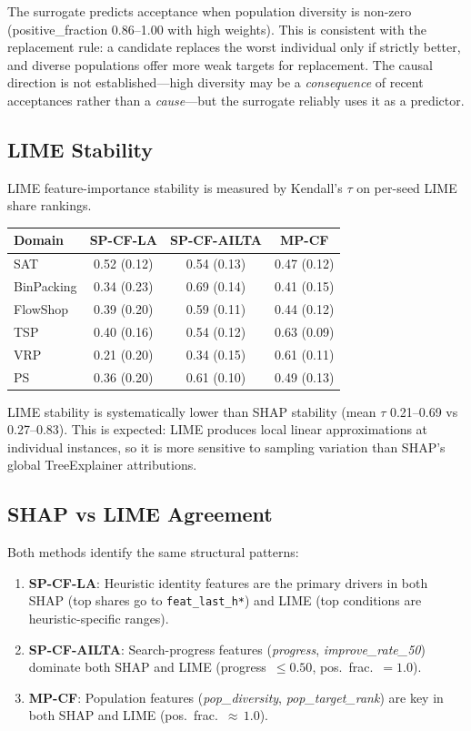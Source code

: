 \documentclass[11pt,a4paper]{article}
\begin{document}
The surrogate predicts acceptance when population diversity is non-zero
(positive\_fraction 0.86--1.00 with high weights). This is consistent with the
replacement rule: a candidate replaces the worst individual only if strictly better,
and diverse populations offer more weak targets for replacement. The causal direction
is not established---high diversity may be a \emph{consequence} of recent acceptances
rather than a \emph{cause}---but the surrogate reliably uses it as a predictor.

\subsection{LIME Stability}

LIME feature-importance stability is measured by Kendall's $\tau$ on per-seed LIME
share rankings.

\begin{table}[H]
\centering
\begin{tabular}{lccc}
\toprule
Domain & SP-CF-LA & SP-CF-AILTA & MP-CF \\
\midrule
SAT & 0.52 (0.12) & 0.54 (0.13) & 0.47 (0.12) \\
BinPacking & 0.34 (0.23) & 0.69 (0.14) & 0.41 (0.15) \\
FlowShop & 0.39 (0.20) & 0.59 (0.11) & 0.44 (0.12) \\
TSP & 0.40 (0.16) & 0.54 (0.12) & 0.63 (0.09) \\
VRP & 0.21 (0.20) & 0.34 (0.15) & 0.61 (0.11) \\
PS & 0.36 (0.20) & 0.61 (0.10) & 0.49 (0.13) \\
\bottomrule
\end{tabular}
\end{table}

LIME stability is systematically lower than SHAP stability (mean $\tau$ 0.21--0.69
vs 0.27--0.83). This is expected: LIME produces local linear approximations at
individual instances, so it is more sensitive to sampling variation than SHAP's
global TreeExplainer attributions.

\subsection{SHAP vs LIME Agreement}

Both methods identify the same structural patterns:

\begin{enumerate}[nosep]
  \item \textbf{SP-CF-LA}: Heuristic identity features are the primary drivers in both
    SHAP (top shares go to \texttt{feat\_last\_h*}) and LIME (top conditions are
    heuristic-specific ranges).
  \item \textbf{SP-CF-AILTA}: Search-progress features
    (\emph{progress}, \emph{improve\_rate\_50}) dominate both SHAP
    and LIME (progress~$\leq 0.50$, pos.\ frac.\ $=1.0$).
  \item \textbf{MP-CF}: Population features
    (\emph{pop\_diversity}, \emph{pop\_target\_rank}) are key in
    both SHAP and LIME (pos.\ frac.\ ${\approx}\,1.0$).
\end{enumerate}
\end{document}
